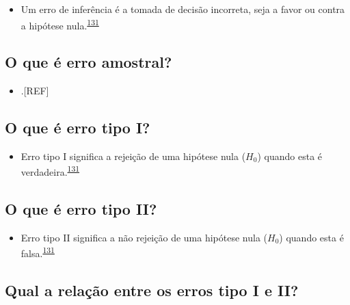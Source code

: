 \documentclass[
]{book}
\providecommand{\tightlist}{%
  \setlength{\itemsep}{0pt}\setlength{\parskip}{0pt}}
\begin{document}
\begin{itemize}
\tightlist
\item
  Um erro de inferência é a tomada de decisão incorreta, seja a favor ou contra a hipótese nula.\textsuperscript{\protect\hyperlink{ref-Curran-Everett2009}{131}}
\end{itemize}

\hypertarget{o-que-uxe9-erro-amostral}{%
\subsection{O que é erro amostral?}\label{o-que-uxe9-erro-amostral}}

\begin{itemize}
\tightlist
\item
  .{[}REF{]}
\end{itemize}

\hypertarget{o-que-uxe9-erro-tipo-i}{%
\subsection{O que é erro tipo I?}\label{o-que-uxe9-erro-tipo-i}}

\begin{itemize}
\tightlist
\item
  Erro tipo I significa a rejeição de uma hipótese nula (\(H_{0}\)) quando esta é verdadeira.\textsuperscript{\protect\hyperlink{ref-Curran-Everett2009}{131}}
\end{itemize}

\hypertarget{o-que-uxe9-erro-tipo-ii}{%
\subsection{O que é erro tipo II?}\label{o-que-uxe9-erro-tipo-ii}}

\begin{itemize}
\tightlist
\item
  Erro tipo II significa a não rejeição de uma hipótese nula (\(H_{0}\)) quando esta é falsa.\textsuperscript{\protect\hyperlink{ref-Curran-Everett2009}{131}}
\end{itemize}

\hypertarget{qual-a-relauxe7uxe3o-entre-os-erros-tipo-i-e-ii}{%
\subsection{Qual a relação entre os erros tipo I e II?}\label{qual-a-relauxe7uxe3o-entre-os-erros-tipo-i-e-ii}}
\end{document}

